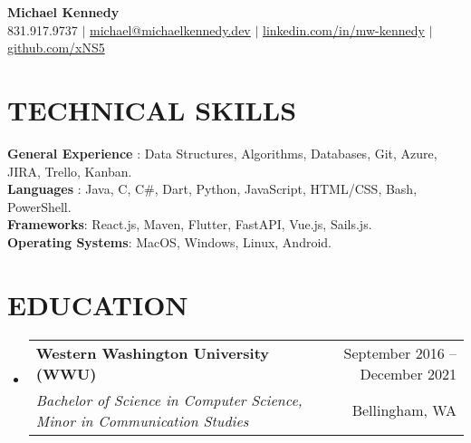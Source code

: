 \documentclass[letterpaper,11pt]{article}
\makeatletter
\newcommand{\resumeSubheading}[4]{
  \vspace{-1pt}\item
    \begin{tabular*}{\textwidth}[t]{l@{\extracolsep{\fill}}r}
      \textbf{#1} & {\color{dark-grey}\small #2}\vspace{1pt}\\ %
      \textit{#3} & {\color{dark-grey} \small #4}\\ %
    \end{tabular*}\vspace{-4pt}
}
\newcommand{\resumeSubHeadingListStart}{\begin{itemize}[leftmargin=0in, label={}]}
\newcommand{\resumeSubHeadingListEnd}{\end{itemize}}
\makeatother
\begin{document}

\begin{center}

    \textbf{\Huge Michael Kennedy} \\ \vspace{5pt}
    \small \faPhone \hspace{2pt} 831.917.9737 \hspace{1pt} $|$
    \hspace{1pt} \faEnvelope \hspace{2pt} \href{mailto:michael@michaelkennedy.dev}{michael@michaelkennedy.dev} \hspace{1pt} $|$ 
    \hspace{1pt} \faLinkedinSquare \hspace{2pt} \href{https://www.linkedin.com/in/mw-kennedy}{linkedin.com/in/mw-kennedy} \hspace{1pt}$|$
    \hspace{1pt} \faGithubSquare \hspace{2pt} \href{https://github.com/xNS5}{github.com/xNS5}
    \\ \vspace{-3pt}
\end{center}

\section{TECHNICAL SKILLS}
 \begin{itemize}[leftmargin=0in, label={}]
    \small{\item{
    \textbf{General Experience} {: Data Structures, Algorithms, Databases, Git, Azure, JIRA, Trello, Kanban.}\\
     \textbf{Languages} {: Java, C, C\#, Dart, Python, JavaScript, HTML/CSS, Bash, PowerShell.} \\
     \textbf{Frameworks}{: React.js, Maven, Flutter, FastAPI, Vue.js, Sails.js.}\\
     \textbf{Operating Systems}{: MacOS, Windows, Linux, Android.}
    }}
 \end{itemize}
 
\section {EDUCATION}
  \resumeSubHeadingListStart
    \resumeSubheading
      {Western Washington University (WWU)}{September 2016 -- December 2021}
      {Bachelor of Science in Computer Science, Minor in Communication Studies}{Bellingham, WA} 
  \resumeSubHeadingListEnd
\end{document}
